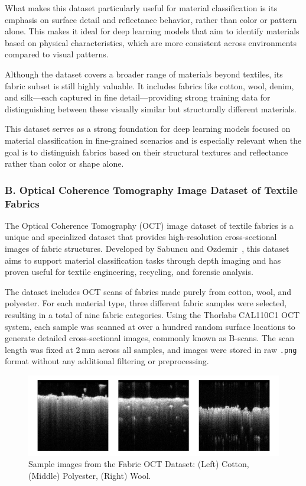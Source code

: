 What makes this dataset particularly useful for material classification is its emphasis on surface detail and reflectance behavior, rather than color or pattern alone. This makes it ideal for deep learning models that aim to identify materials based on physical characteristics, which are more consistent across environments compared to visual patterns.

Although the dataset covers a broader range of materials beyond textiles, its fabric subset is still highly valuable. It includes fabrics like cotton, wool, denim, and silk—each captured in fine detail—providing strong training data for distinguishing between these visually similar but structurally different materials.

This dataset serves as a strong foundation for deep learning models focused on material classification in fine-grained scenarios and is especially relevant when the goal is to distinguish fabrics based on their structural textures and reflectance rather than color or shape alone.

\subsubsection{B. Optical Coherence Tomography Image Dataset of Textile Fabrics}

The Optical Coherence Tomography (OCT) image dataset of textile fabrics is a unique and specialized dataset that provides high-resolution cross-sectional images of fabric structures. Developed by Sabuncu and Ozdemir~\cite{sabuncu2022optical}, this dataset aims to support material classification tasks through depth imaging and has proven useful for textile engineering, recycling, and forensic analysis.

The dataset includes OCT scans of fabrics made purely from cotton, wool, and polyester. For each material type, three different fabric samples were selected, resulting in a total of nine fabric categories. Using the Thorlabs CAL110C1 OCT system, each sample was scanned at over a hundred random surface locations to generate detailed cross-sectional images, commonly known as B-scans. The scan length was fixed at 2\,mm across all samples, and images were stored in raw \texttt{.png} format without any additional filtering or preprocessing.

\begin{figure}[H]
    \centering
    \begin{minipage}{0.8\linewidth}
        \includegraphics[width=\linewidth]{images/FabricOCTDataset.png}
    \end{minipage}
    \caption[Sample images from the Fabric OCT Dataset]{Sample images from the Fabric OCT Dataset: (Left) Cotton, (Middle) Polyester, (Right) Wool.}
\end{figure}

